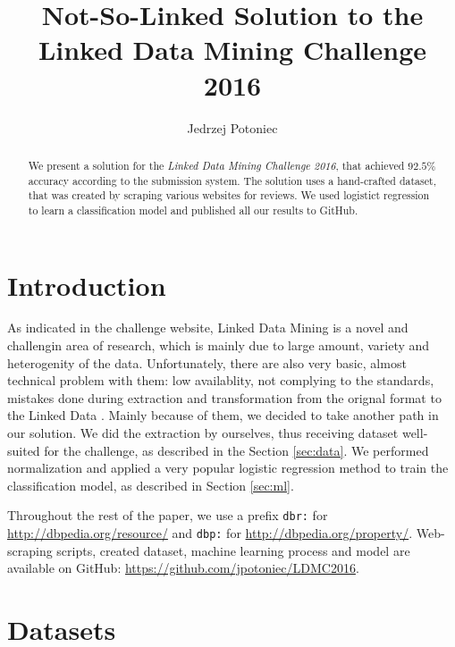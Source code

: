 \documentclass{llncs}
\begin{document}
\title{Not-So-Linked Solution to the Linked Data Mining Challenge 2016}
\author{Jedrzej Potoniec}

\maketitle

\begin{abstract}
We present a solution for the \emph{Linked Data Mining Challenge 2016}, that achieved $92.5\%$ accuracy according to the submission system.
The solution uses a hand-crafted dataset, that was created by scraping various websites for reviews.
We used logistict regression to learn a classification model and published all our results to GitHub.
\end{abstract}


\section{Introduction}

As indicated in the challenge website, Linked Data Mining is a novel and challengin area of research, which is mainly due to large amount, variety and heterogenity of the data.
Unfortunately, there are also very basic, almost technical problem with them: low availablity, not complying to the standards, mistakes done during extraction and transformation from the orignal format to the Linked Data \cite{lodlaudromat}.
Mainly because of them, we decided to take another path in our solution.
We did the extraction by ourselves, thus receiving dataset well-suited for the challenge, as described in the Section \ref{sec:data}.
We performed normalization and applied a very popular logistic regression method to train the classification model, as described in Section \ref{sec:ml}.

Throughout the rest of the paper, we use a prefix \texttt{dbr:} for \url{http://dbpedia.org/resource/} and \texttt{dbp:} for \url{http://dbpedia.org/property/}.
Web-scraping scripts, created dataset, machine learning process and model are available on GitHub: \url{https://github.com/jpotoniec/LDMC2016}.

\section{Datasets\label{sec:data}}
\end{document}

